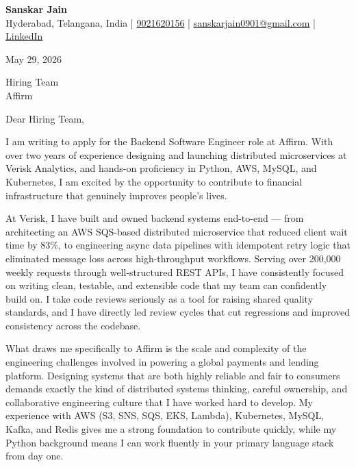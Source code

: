 \documentclass[a4paper,10pt]{article}
\begin{document}
\begin{center}
    {\LARGE \textbf{Sanskar Jain}} \\[4pt]
    Hyderabad, Telangana, India \;|\;
    \href{tel:9021620156}{9021620156} \;|\;
    \href{mailto:sanskarjain0901@gmail.com}{sanskarjain0901@gmail.com} \;|\;
    \href{https://www.linkedin.com/in/sanskar-jain0901/}{LinkedIn}
\end{center}

\vspace{8pt}

May 29, 2026

\vspace{8pt}

Hiring Team \\
Affirm \\

\vspace{8pt}

Dear Hiring Team,

\vspace{4pt}

I am writing to apply for the Backend Software Engineer role at Affirm. With over two years of experience designing and launching distributed microservices at Verisk Analytics, and hands-on proficiency in Python, AWS, MySQL, and Kubernetes, I am excited by the opportunity to contribute to financial infrastructure that genuinely improves people's lives.

At Verisk, I have built and owned backend systems end-to-end — from architecting an AWS SQS-based distributed microservice that reduced client wait time by 83\%, to engineering async data pipelines with idempotent retry logic that eliminated message loss across high-throughput workflows. Serving over 200,000 weekly requests through well-structured REST APIs, I have consistently focused on writing clean, testable, and extensible code that my team can confidently build on. I take code reviews seriously as a tool for raising shared quality standards, and I have directly led review cycles that cut regressions and improved consistency across the codebase.

What draws me specifically to Affirm is the scale and complexity of the engineering challenges involved in powering a global payments and lending platform. Designing systems that are both highly reliable and fair to consumers demands exactly the kind of distributed systems thinking, careful ownership, and collaborative engineering culture that I have worked hard to develop. My experience with AWS (S3, SNS, SQS, EKS, Lambda), Kubernetes, MySQL, Kafka, and Redis gives me a strong foundation to contribute quickly, while my Python background means I can work fluently in your primary language stack from day one.
\end{document}
